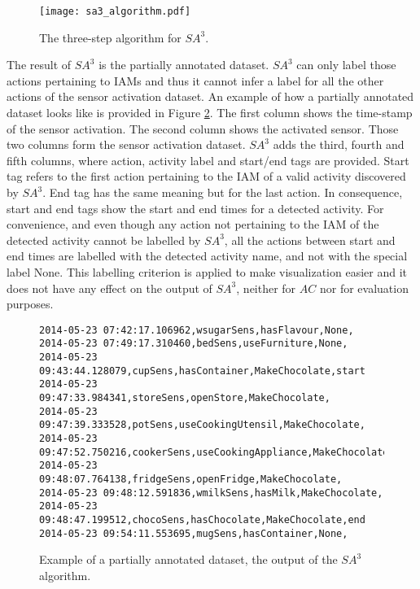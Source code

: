 \begin{figure}[htbp]
\centering
\texttt{[image: sa3\_algorithm.pdf]}
    \caption{The three-step algorithm for $SA^3$.}
    \label{fig:sa3_algorithm}
\end{figure}

The result of $SA^3$ is the partially annotated dataset. $SA^3$ can only label those actions pertaining to IAMs and thus it cannot infer a label for all the other actions of the sensor activation dataset. An example of how a partially annotated dataset looks like is provided in Figure \ref{fig-partially-annotated}. The first column shows the time-stamp of the sensor activation. The second column shows the activated sensor. Those two columns form the sensor activation dataset. $SA^3$ adds the third, fourth and fifth columns, where action, activity label and start/end tags are provided. Start tag refers to the first action pertaining to the IAM of a valid activity discovered by $SA^3$. End tag has the same meaning but for the last action. In consequence, start and end tags show the start and end times for a detected activity. For convenience, and even though any action not pertaining to the IAM of the detected activity cannot be labelled by $SA^3$, all the actions between start and end times are labelled with the detected activity name, and not with the special label None. This labelling criterion is applied to make visualization easier and it does not have any effect on the output of $SA^3$, neither for $AC$ nor for evaluation purposes.

\begin{figure}[htbp]
\begin{small}
\begin{lstlisting}
2014-05-23 07:42:17.106962,wsugarSens,hasFlavour,None,
2014-05-23 07:49:17.310460,bedSens,useFurniture,None,
2014-05-23 09:43:44.128079,cupSens,hasContainer,MakeChocolate,start
2014-05-23 09:47:33.984341,storeSens,openStore,MakeChocolate,
2014-05-23 09:47:39.333528,potSens,useCookingUtensil,MakeChocolate,
2014-05-23 09:47:52.750216,cookerSens,useCookingAppliance,MakeChocolate,
2014-05-23 09:48:07.764138,fridgeSens,openFridge,MakeChocolate,
2014-05-23 09:48:12.591836,wmilkSens,hasMilk,MakeChocolate,
2014-05-23 09:48:47.199512,chocoSens,hasChocolate,MakeChocolate,end
2014-05-23 09:54:11.553695,mugSens,hasContainer,None,
\end{lstlisting}
\end{small}
\caption{Example of a partially annotated dataset, the output of the $SA^3$ algorithm.}
\label{fig-partially-annotated}
\end{figure}

